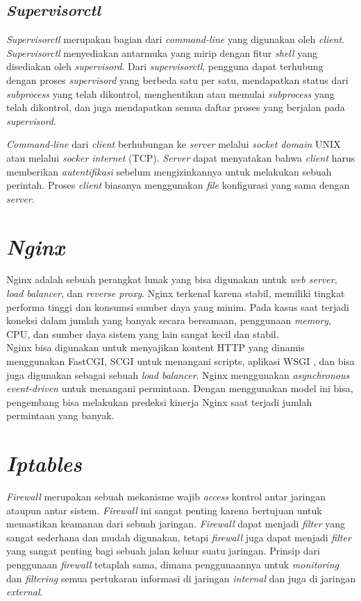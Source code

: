  \subsection{\textit{Supervisorctl}}
 \textit{Supervisorctl} merupakan bagian dari \textit{command-line} yang digunakan oleh \textit{client}. \textit{Supervisorctl} menyediakan antarmuka yang mirip dengan fitur \textit{shell} yang disediakan oleh \textit{supervisord}. Dari \textit{supervisorctl}, pengguna dapat terhubung dengan proses \textit{supervisord} yang berbeda satu per satu, mendapatkan status dari \textit{subprocess} yang telah dikontrol, menghentikan atau memulai \textit{subprocess} yang telah dikontrol, dan juga mendapatkan semua daftar proses yang berjalan pada \textit{supervisord}.
 
 \textit{Command-line} dari \textit{client} berhubungan ke \textit{server} melalui \textit{socket domain} UNIX atau melalui \textit{socker internet} (TCP). \textit{Server} dapat menyatakan bahwa \textit{client} harus memberikan \textit{autentifikasi} sebelum mengizinkannya untuk melakukan sebuah perintah. Proses \textit{client} biasanya menggunakan \textit{file} konfigurasi yang sama dengan \textit{server}. 
 
 \section{\textit{Nginx}}
 Nginx adalah sebuah perangkat lunak yang bisa digunakan untuk \textit{web server}, \textit{load balancer}, dan \textit{reverse proxy}. Nginx terkenal karena stabil, memiliki tingkat performa tinggi dan konsumsi sumber daya yang minim. Pada kasus saat terjadi koneksi dalam jumlah yang banyak secara bersamaan, penggunaan \textit{memory}, CPU, dan sumber daya sistem yang lain sangat kecil dan stabil. \cite{chi_web_2012}\\
 \indent Nginx bisa digunakan untuk menyajikan kontent HTTP yang dinamis menggunakan FastCGI, SCGI untuk menangani scripts, aplikasi WSGI , dan bisa juga digunakan sebagai sebuah \textit{load balancer}. Nginx menggunakan \textit{asynchronous event-driven} untuk menangani permintaan. Dengan menggunakan model ini bisa, pengembang bisa melakukan predeksi kinerja Nginx saat terjadi jumlah permintaan yang banyak.
	 
 \section{\textit{Iptables}} 
 \textit{Firewall} merupakan sebuah mekanisme wajib \textit{access} kontrol antar jaringan ataupun antar sistem. \textit{Firewall} ini sangat penting karena bertujuan untuk memastikan keamanan dari sebuah jaringan. \textit{Firewall} dapat menjadi \textit{filter} yang sangat sederhana dan mudah digunakan, tetapi \textit{firewall} juga dapat menjadi \textit{filter} yang sangat penting bagi sebuah jalan keluar suatu jaringan. Prinsip dari penggunaan \textit{firewall} tetaplah sama, dimana penggunaannya untuk \textit{monitoring} dan \textit{filtering} semua pertukaran informasi di jaringan \textit{internal} dan juga di jaringan \textit{external}.
 
